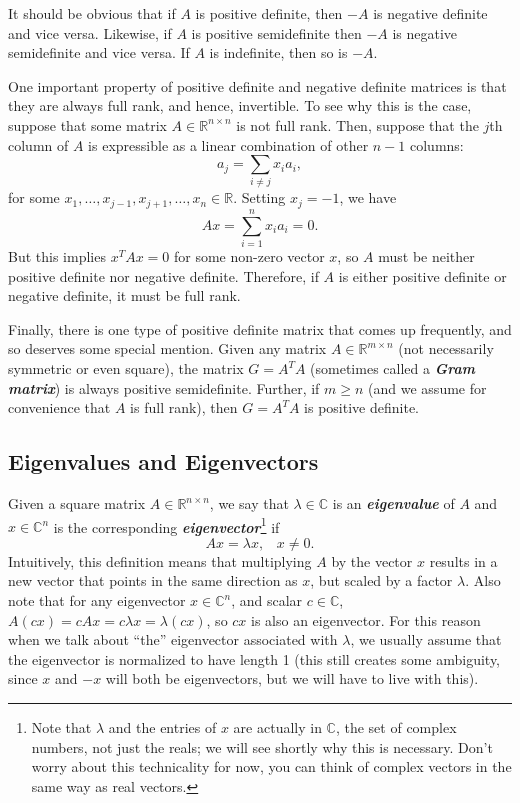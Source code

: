 \documentclass[12pt]{article}
\begin{document}
It should be obvious that if $A$ is positive definite, then $-A$ is
negative definite and vice versa.  Likewise, if $A$ is positive
semidefinite then $-A$ is negative semidefinite and vice versa.  If
$A$ is indefinite, then so is $-A$.  

One important property of positive definite and negative definite matrices 
is that they are always full rank, and hence, invertible.  To see why
this is the case, suppose that some matrix $A \in \mathbb{R}^{n \times n}$
is not full rank.  Then, suppose that the $j$th column of $A$ is expressible 
as a linear combination of other $n-1$ columns:
\[ a_j = \sum_{i \neq j} x_i a_i, \]
for some $x_1,\ldots,x_{j-1}, x_{j+1}, \ldots,x_{n} \in \mathbb{R}$.  Setting $x_j = -1$, we have
\[ Ax = \sum_{i=1}^n x_i a_i = 0. \]
But this implies $x^T Ax = 0$ for some non-zero vector $x$, so $A$ must be
neither positive definite nor negative definite.  Therefore, if $A$ is
either positive definite or negative definite, it must be full rank.

Finally, there is one type of positive definite matrix that comes up
frequently, and so deserves some special mention.  Given any matrix $A
\in \mathbb{R}^{m \times n}$ (not necessarily symmetric or even
square), the matrix $G = A^T A$ (sometimes called a
\textbf{\textit{Gram matrix}}) is always positive semidefinite.
Further, if $m \geq n$ (and we assume for convenience that $A$ is full
rank), then $G = A^T A$ is positive definite.

\subsection{Eigenvalues and Eigenvectors}

Given a square matrix $A \in \mathbb{R}^{n \times n}$, we say that
$\lambda \in \mathbb{C}$ is an \textbf{\textit{eigenvalue}} of $A$ and
$x \in \mathbb{C}^n$  is the corresponding
\textbf{\textit{eigenvector}}\footnote{Note that $\lambda$ and the
  entries of $x$ are actually in 
$\mathbb{C}$, the set of complex numbers, not just the reals; we
will see shortly why this is necessary. Don't worry about this
technicality for now, you can think of complex vectors in the same way
as real vectors.} if
\[Ax = \lambda x, \;\;\; x \neq 0. \]
Intuitively, this definition
means that multiplying $A$ by the vector $x$ results in a new vector
that points in the same direction as $x$, but scaled by a factor
$\lambda$.  Also note that for any eigenvector $x \in \mathbb{C}^n$,
and scalar $c \in \mathbb{C}$, 
$A(cx) = cAx = c \lambda x = \lambda(cx)$, so $cx$ is also an
eigenvector.   For this reason when we talk about ``the'' eigenvector
associated with $\lambda$, we usually assume that the eigenvector is
normalized to have length 1 (this still creates some ambiguity, since
$x$ and $-x$ will both be eigenvectors, but we will have to live with
this).
\end{document}

